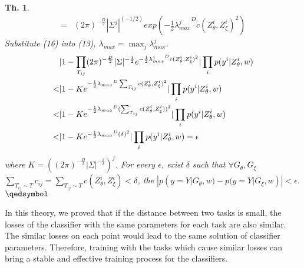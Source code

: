 \documentclass[10pt,journal,compsoc]{IEEEtran}
\newtheorem{theorem}{Th.}[section]  %
\begin{document}
\begin{theorem}
\begin{align}
     = &(2\pi)^{-\frac{D}{2}}|{\Sigma^j}|^{(-1/2)}exp(-\frac{1}{2}{\lambda^j_{max}}^{D}c(Z_\theta^i,Z_\xi^i)^2)
\end{align}
Substitute (16) into (13), $\lambda_{max}=\max_j \lambda^j_{max}$. 
\begin{align}
    &|1-\prod_{T_{ij}} (2\pi)^{-\frac{D}{2}}|\Sigma|^{-\frac{1}{2}}e^{-\frac{1}{2}{\lambda^j_{max}}^{D}c(Z_\theta^i,Z_\xi^i)^2}|\prod_i p(y^i|Z_\theta^i,w)\notag\\
    <&|1- K e^{-\frac{1}{2}{\lambda_{max}}^{D}\sum_{T_{ij}}c(Z_\theta^i,Z_\xi^i)^2}|\prod_i p(y^i|Z_\theta^i,w)\notag\\
    <&|1- K e^{-\frac{1}{2}{\lambda_{max}}^{D}(\sum_{T_{ij}}c(Z_\theta^i,Z_\xi^i))^2}|\prod_i p(y^i|Z_\theta^i,w)\notag\\
    <&|1- K e^{-\frac{1}{2}{\lambda_{max}}^{D}(\delta)^2}|\prod_i p(y^i|Z_\theta^i,w)=\epsilon
\end{align}
where $K=((2\pi)^{-\frac{D}{2}}|\Sigma|^{-\frac{1}{2}})^j$. For every $\epsilon$, exist $\delta$ such that $\forall G_\theta, G_\xi$ $\sum_{T_{ij}\sim T}c_{ij}=\sum_{T_{ij}\sim T}c(Z_\theta^i,Z_\xi^i)<\delta$, the $|p(y=Y|G_\theta,w) - p(y=Y|G_\xi,w)|<\epsilon.$$\hfill\qedsymbol$
\end{theorem}

In this theory, we proved that if the distance between two tasks is small, the losses of the classifier with the same parameters for each task are also similar. The similar losses on each point would lead to the same solution of classifier parameters. Therefore, training with the tasks which cause similar losses can bring a stable and effective training process for the classifiers.
\end{document}
